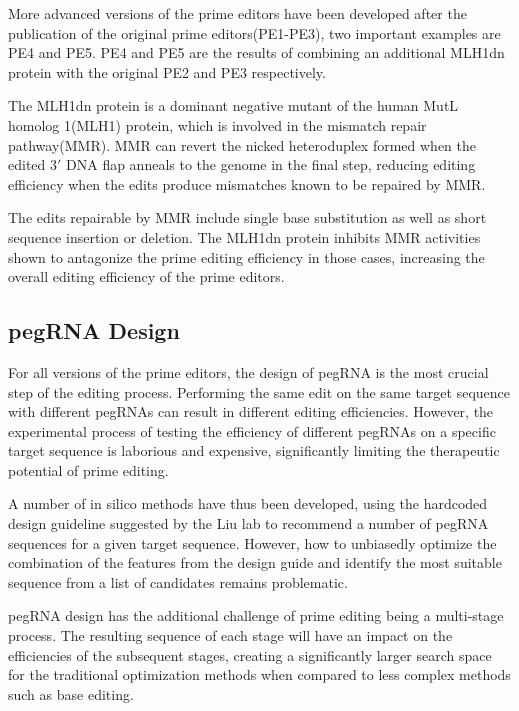 \documentclass[12pt]{article}
\begin{document}
More advanced versions of the prime editors have been developed after the publication of the original prime editors(PE1-PE3), two important examples are PE4 and PE5. PE4 and PE5 are the results of combining an additional MLH1dn protein with the original PE2 and PE3 respectively. 

The MLH1dn protein is a dominant negative mutant of the human MutL homolog 1(MLH1) protein, which is involved in the mismatch repair pathway(MMR). MMR can revert the nicked heteroduplex formed when the edited $3'$ DNA flap anneals to the genome in the final step, reducing editing efficiency when the edits produce mismatches known to be repaired by MMR. 

The edits repairable by MMR include single base substitution as well as short sequence insertion or deletion. The MLH1dn protein inhibits MMR activities shown to antagonize the prime editing efficiency in those cases,  increasing the overall editing efficiency of the prime editors\cite{chenEnhancedPrimeEditing2021}.

\subsection{pegRNA Design}

For all versions of the prime editors, the design of pegRNA is the most crucial step of the editing process. Performing the same edit on the same target sequence with different pegRNAs can result in different editing efficiencies. However, the experimental process of testing the efficiency of different pegRNAs on a specific target sequence is laborious and expensive, significantly limiting the therapeutic potential of prime editing\cite{mathisPredictingPrimeEditing2023}. 

A number of in silico methods have thus been developed, using the hardcoded design guideline suggested by the Liu lab to recommend a number of pegRNA sequences for a given target sequence\cite{hwangPEDesignerPEAnalyzerWebbased2021}. However, how to unbiasedly optimize the combination of the features from the design guide and identify the most suitable sequence from a list of candidates remains problematic\cite{liEasyPrimeMachineLearning2021}. 

pegRNA design has the additional challenge of prime editing being a multi-stage process. The resulting sequence of each stage will have an impact on the efficiencies of the subsequent stages, creating a significantly larger search space for the traditional optimization methods when compared to less complex methods such as base editing.
\end{document}
